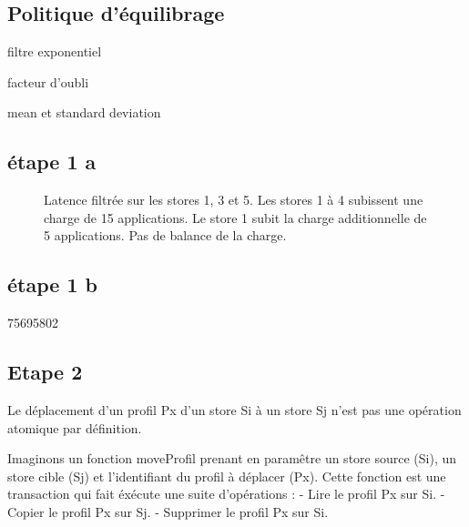 \documentclass[a4paper,11pt]{article}
\begin{document}
\subsection{Politique d'équilibrage}
filtre exponentiel

facteur d'oubli

mean et standard deviation

\subsection{étape 1 a}

\begin{figure}

    \caption{
        Latence filtrée sur les stores 1, 3 et 5. 
        Les stores 1 à 4 subissent une charge de 15 applications. 
        Le store 1 subit la charge additionnelle de 5 applications. 
        Pas de balance de la charge.
        }
            
    \label{stores_nobalancing}
\end{figure}


\subsection{étape 1 b}
75695802

\subsection{Etape 2}
Le déplacement d'un profil Px d'un store Si à un store Sj n'est pas une opération atomique par définition. 

Imaginons un fonction moveProfil prenant en paramêtre un store source (Si), un store cible (Sj) et l'identifiant du profil à déplacer (Px). Cette fonction est une transaction qui fait éxécute une suite d'opérations :
- Lire le profil Px sur Si.
- Copier le profil Px sur Sj.
- Supprimer le profil Px sur Si.
\end{document}
